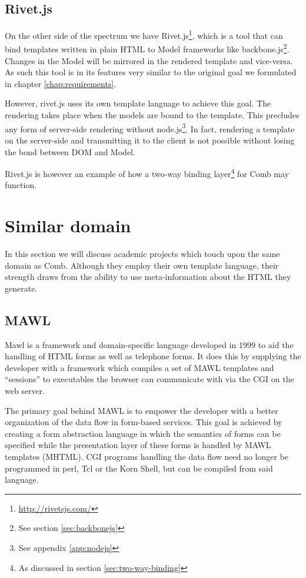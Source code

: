 \documentclass[thesis.tex]{subfiles}
\begin{document}
\subsection{Rivet.js}
On the other side of the spectrum we have
Rivet.js\footnote{\url{http://rivetsjs.com/}}, which is a tool that
can bind templates written in plain HTML to Model frameworks like
backbone.js\footnote{See section \ref{sec:backbonejs}}.
Changes in the Model will be mirrored in the rendered template and vice-versa.
As such this tool is in its features very similar to the original goal we
formulated in chapter \ref{chap:requirements}.

However, rivet.js uses its own template language to achieve this goal.
The rendering takes place when the models are bound to the template.
This precludes any form of server-side rendering without
node.js\footnote{See appendix \ref{app:nodejs}}.
In fact, rendering a template on the server-side and transmitting it to the
client is not possible without losing the bond between DOM and Model.

Rivet.js is however an example of how a two-way binding
layer\footnote{As discussed in section \ref{sec:two-way-binding}}
for Comb may function.



\section{Similar domain}
In this section we will discuss academic projects which touch upon the same
domain as Comb.
Although they employ their own template language, their strength draws from
the ability to use meta-information about the HTML they generate.

\subsection{MAWL}
Mawl\cite{MAWL} is a framework and domain-specific language developed in 1999
to aid the handling of HTML forms as well as telephone forms.
It does this by supplying the developer with a framework which compiles
a set of MAWL templates and ``sessions'' to executables
the browser can communicate with via the CGI on the web server.

The primary goal behind MAWL is to empower the developer with a better
organization of the data flow in form-based services.
This goal is achieved by creating a form abstraction language in which the
semantics of forms can be specified while the presentation layer of these forms
is handled by MAWL templates (MHTML).
CGI programs handling the data flow need no longer be programmed in
perl, Tcl or the Korn Shell, but can be compiled from said language.
\end{document}
